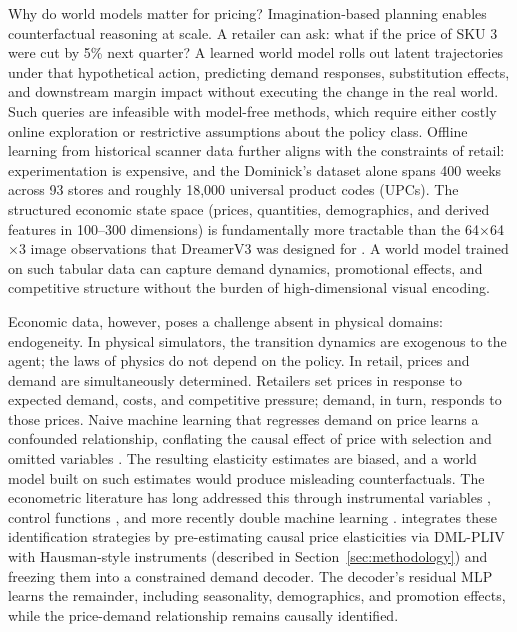 Why do world models matter for pricing? Imagination-based planning enables counterfactual reasoning at scale. A retailer can ask: what if the price of SKU 3 were cut by 5\% next quarter? A learned world model rolls out latent trajectories under that hypothetical action, predicting demand responses, substitution effects, and downstream margin impact without executing the change in the real world. Such queries are infeasible with model-free methods, which require either costly online exploration or restrictive assumptions about the policy class. Offline learning from historical scanner data \citep{dominicks1999} further aligns with the constraints of retail: experimentation is expensive, and the Dominick's dataset alone spans 400 weeks across 93 stores and roughly 18,000 universal product codes (UPCs). The structured economic state space (prices, quantities, demographics, and derived features in 100--300 dimensions) is fundamentally more tractable than the 64$\times$64$\times$3 image observations that DreamerV3 was designed for \citep{hafner2023dreamerv3}. A world model trained on such tabular data can capture demand dynamics, promotional effects, and competitive structure without the burden of high-dimensional visual encoding.

Economic data, however, poses a challenge absent in physical domains: endogeneity. In physical simulators, the transition dynamics are exogenous to the agent; the laws of physics do not depend on the policy. In retail, prices and demand are simultaneously determined. Retailers set prices in response to expected demand, costs, and competitive pressure; demand, in turn, responds to those prices. Naive machine learning that regresses demand on price learns a confounded relationship, conflating the causal effect of price with selection and omitted variables \citep{hausman1978specification}. The resulting elasticity estimates are biased, and a world model built on such estimates would produce misleading counterfactuals. The econometric literature has long addressed this through instrumental variables \citep{hausman1978specification}, control functions \citep{berry1995automobile}, and more recently double machine learning \citep{chernozhukov2018dml, bach2022doubleml}. \dreamprice{} integrates these identification strategies by pre-estimating causal price elasticities via DML-PLIV with Hausman-style instruments (described in Section~\ref{sec:methodology}) and freezing them into a constrained demand decoder. The decoder's residual MLP learns the remainder, including seasonality, demographics, and promotion effects, while the price-demand relationship remains causally identified.


